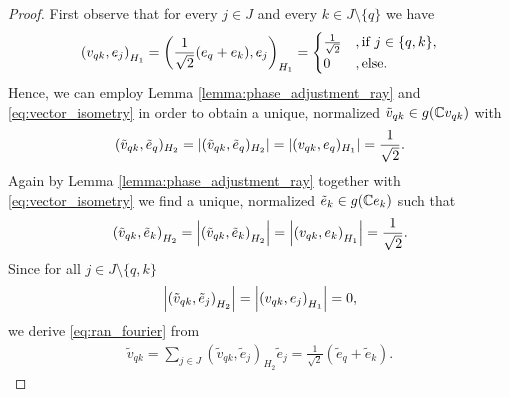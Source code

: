 \begin{proof}
	First observe that for every $j \in J$ and every $k \in J \setminus \{q\}$ we have
	\begin{align*}
		{\left ( v_{qk}, e_j \right )}_{H_1} = {\left ( \frac{1}{\sqrt{2}}(e_q + e_k), e_j \right )}_{H_1} =
		\begin{cases}
			\frac{1}{\sqrt{2}} &, \text{if } j \in \{q,k\}, \\
			0 &, \text{else}.
		\end{cases}
	\end{align*}
	Hence, we can employ Lemma \ref{lemma:phase_adjustment_ray} and \eqref{eq:vector_isometry} in order to obtain a unique, normalized $\tilde{v}_{qk} \in g(\mathbb{C} v_{qk})$ with
	\begin{align*}
		(\tilde{v}_{qk}, \tilde{e}_q)_{H_2} = {\left | (\tilde{v}_{qk}, \tilde{e}_q)_{H_2} \right |} = {\left | (v_{qk}, e_q)_{H_1} \right |} = \frac{1}{\sqrt{2}}.
	\end{align*}
	Again by Lemma \ref{lemma:phase_adjustment_ray} together with \eqref{eq:vector_isometry} we find a unique, normalized $\tilde{e}_{k} \in g(\mathbb{C} e_k)$ such that
	\begin{align*}
		{\left ( \tilde{v}_{qk}, \tilde{e}_k \right )}_{H_2} = {\left | {\left ( \tilde{v}_{qk}, \tilde{e}_k \right )}_{H_2} \right |} = {\left | {\left ( v_{qk}, e_k \right )}_{H_1} \right |} = \frac{1}{\sqrt{2}}.
	\end{align*}
	Since for all $j \in J \setminus \{q, k\}$
	\begin{align*}
		{\left | {\left ( \tilde{v}_{qk}, \tilde{e}_j \right )}_{H_2} \right |} = {\left | {\left ( v_{qk}, e_j \right )}_{H_1} \right |} = 0,
	\end{align*}
	we derive \eqref{eq:ran_fourier} from
	\begin{align*}
		\tilde{v}_{qk} = \sum_{j \in J} (\tilde{v}_{qk}, \tilde{e}_j)_{H_2} \tilde{e}_j = \frac{1}{\sqrt{2}} (\tilde{e}_q + \tilde{e}_k).
	\end{align*}
	

\end{proof}
